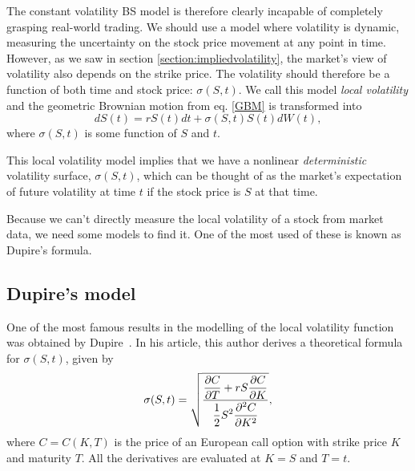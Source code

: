 The constant volatility BS model is therefore clearly incapable of completely grasping real-world trading. We should use a model where volatility is dynamic, measuring the uncertainty on the stock price movement at any point in time.
However, as we saw in section \ref{section:impliedvolatility}, the market's view of volatility also depends on the strike price.
The volatility should therefore be a function of both time and stock price: $\sigma(S,t)$. We call this model \emph{local volatility} and the geometric Brownian motion from eq. \ref{GBM} is transformed into
\begin{equation}\label{GBM2}
dS(t)=rS(t)dt+\sigma(S,t)S(t)dW(t),
\end{equation}
\noindent where $\sigma(S,t)$ is some function of $S$ and $t$.


This local volatility model implies that we have a nonlinear \emph{deterministic} volatility surface, $\sigma(S,t)$, which can be thought of as the market's expectation of future volatility at time $t$ if the stock price is $S$ at that time.



Because we can't directly measure the local volatility of a stock from market data, we need some models to find it. One of the most used of these is known as Dupire's formula.


\subsection{Dupire's model}
\label{subsection:Dupire}
One of the most famous results in the modelling of the local volatility function was obtained by Dupire~\cite{Dupire}. In his article, this author derives a theoretical formula for $\sigma(S,t)$, given by
\begin{equation}\label{dupire}
\sigma(S,t)=\sqrt{\frac{\displaystyle\pdv{C}{T}+rS\pdv{C}{K}}{\displaystyle\frac{1}{2}S^2\pdv{^2C}{K^2}}},
\end{equation}
\noindent where $C=C(K,T)$ is the price of an European call option with strike price $K$ and maturity $T$. All the derivatives are evaluated at $K=S$ and $T=t$.



